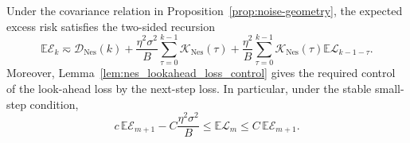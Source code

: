 \begin{proposition}
\label{prop:nes_risk_recursion}
Under the covariance relation in Proposition~\ref{prop:noise-geometry}, the expected excess risk satisfies the two-sided
recursion
\begin{equation}
\label{eq:nes_risk_recursion_form}
    \mathbb{E}\mathcal E_k
    \eqsim
    \mathcal D_{\mathrm{Nes}}(k)
    +
    \frac{\eta^2\sigma^2}{B}\sum_{\tau=0}^{k-1}\mathcal K_{\mathrm{Nes}}(\tau)
    +
    \frac{\eta^2}{B}\sum_{\tau=0}^{k-1}\mathcal K_{\mathrm{Nes}}(\tau)
    \mathbb{E}\mathcal L_{k-1-\tau}.
\end{equation}
Moreover, Lemma~\ref{lem:nes_lookahead_loss_control} gives the required control of the look-ahead loss by the
next-step loss.  In particular, under the stable small-step condition,
\[
    c\,\mathbb{E}\mathcal E_{m+1}-C\frac{\eta^2\sigma^2}{B}
    \le
    \mathbb{E}\mathcal L_m
    \le
    C\,\mathbb{E}\mathcal E_{m+1}.
\]
\end{proposition}

